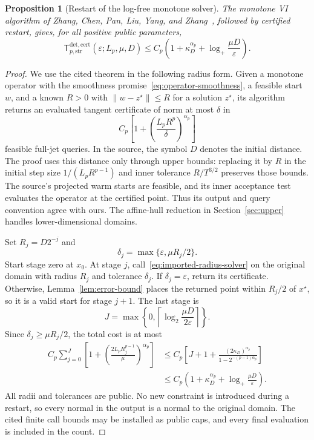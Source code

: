 \documentclass[11pt]{article}
\numberwithin{equation}{section}
\newtheorem{proposition}[theorem]{Proposition}
\theoremstyle{definition}
\theoremstyle{remark}
\newcommand{\Tcert}{\mathsf T_{p,\mathrm{str}}^{\mathrm{det,cert}}}
\newcommand{\ap}{\alpha_p}
\newcommand{\logplus}{\log_{+}}
\begin{document}
\begin{proposition}[Restart of the log-free monotone solver]
\label{prop:literature-restart}
The monotone VI algorithm of Zhang, Chen, Pan, Liu, Yang, and
Zhang~\cite[Theorem~5.1]{zhangchen2026}, followed by certified restart,
gives, for all positive public parameters,
\begin{equation}\label{eq:sharper-upper}
\Tcert(\varepsilon;L_p,\mu,D)
\le C_p\left(1+\kappa_D^{\ap}+
\logplus\frac{\mu D}{\varepsilon}\right).
\end{equation}
\end{proposition}
\begin{proof}
We use the cited theorem in the following radius form. Given a monotone
operator with the smoothness promise~\eqref{eq:operator-smoothness}, a feasible start
$w$, and a known $R>0$ with $\|w-z^\star\|\le R$ for a solution
$z^\star$, its algorithm returns an evaluated tangent certificate of
norm at most $\delta$ in
\begin{equation}\label{eq:imported-radius-solver}
C_p\left[1+\left(\frac{L_pR^p}{\delta}\right)^{\ap}\right]
\end{equation}
feasible full-jet queries. In the source, the symbol $D$ denotes the
initial distance. The proof uses this distance only through upper
bounds: replacing it by $R$ in the initial step size
$1/(L_pR^{p-1})$ and inner tolerance $R/T^{3/2}$ preserves those
bounds. The source's projected warm starts are feasible, and its inner
acceptance test evaluates the operator at the certified point. Thus its
output and query convention agree with ours. The affine-hull reduction
in Section~\ref{sec:upper} handles lower-dimensional domains.

Set $R_j=D2^{-j}$ and
\[
\delta_j=\max\{\varepsilon,\mu R_j/2\}.
\]
Start stage zero at $x_0$. At stage $j$, call~\eqref{eq:imported-radius-solver}
on the original domain with radius $R_j$ and tolerance $\delta_j$.
If $\delta_j=\varepsilon$, return its certificate. Otherwise,
Lemma~\ref{lem:error-bound} places the returned point within $R_j/2$
of $x^\star$, so it is a valid start for stage $j+1$.
The last stage is
\[
J=\max\!\left\{0,\left\lceil
\log_2\frac{\mu D}{2\varepsilon}\right\rceil\right\}.
\]
Since $\delta_j\ge\mu R_j/2$, the total cost is at most
\begin{align*}
C_p\sum_{j=0}^{J}
\left[1+\left(\frac{2L_pR_j^{p-1}}{\mu}\right)^{\ap}\right]
&\le C_p\left[J+1+
\frac{(2\kappa_D)^{\ap}}{1-2^{-(p-1)\ap}}\right]\\
&\le C_p\left(1+\kappa_D^{\ap}+
\logplus\frac{\mu D}{\varepsilon}\right).
\end{align*}
All radii and tolerances are public. No new constraint is introduced
during a restart, so every normal in the output is a normal to the
original domain. The cited finite call bounds may be installed as public
caps, and every final evaluation is included in the count.
\end{proof}
\end{document}
